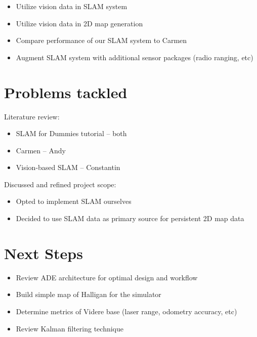 \documentclass[12pt]{article}
\begin{document}
\begin{itemize}
    \item Utilize vision data in SLAM system
    \item Utilize vision data in 2D map generation
    \item Compare performance of our SLAM system to Carmen
    \item Augment SLAM system with additional sensor packages (radio ranging,
          etc)
\end{itemize}


\section{Problems tackled}

Literature review:
\begin{itemize}
    \item SLAM for Dummies tutorial -- both
    \item Carmen -- Andy
    \item Vision-based SLAM -- Constantin
\end{itemize}

Discussed and refined project scope:
\begin{itemize}
    \item Opted to implement SLAM ourselves
    \item Decided to use SLAM data as primary source for persistent 2D map data
\end{itemize}


\section{Next Steps}

\begin{itemize}
    \item Review ADE architecture for optimal design and workflow
    \item Build simple map of Halligan for the simulator
    \item Determine metrics of Videre base (laser range, odometry accuracy, etc)
    \item Review Kalman filtering technique
\end{itemize}
\end{document}
